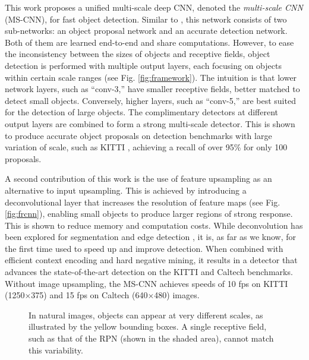 \documentclass[runningheads]{llncs}
\begin{document}
This work proposes a unified multi-scale deep CNN,
denoted the {\it multi-scale CNN\/} (MS-CNN), for fast object detection.
Similar to \cite{DBLP:conf/nips/shaoqing15fasterRcnn}, this
network consists of two sub-networks: an object proposal network and an
accurate detection network. Both of them are learned end-to-end and share
computations. However, to ease the inconsistency between the sizes of
objects and receptive fields, object detection is performed with multiple
output layers, each focusing on objects within certain scale ranges
(see Fig. \ref{fig:framework}). The intuition is that lower network layers,
such as ``conv-3,'' have smaller receptive fields, better matched
to detect small objects. Conversely, higher layers, such as ``conv-5,''
are best suited for the detection of large objects. The complimentary
detectors at different output layers are combined to form a strong
multi-scale detector. This is shown to produce accurate object
proposals on detection benchmarks with large variation
of scale, such as KITTI \cite{DBLP:conf/cvpr/GeigerLU12},
achieving a recall of over 95\% for only 100 proposals.

A second contribution of this work is the use of feature upsampling as an
alternative to input upsampling. This is achieved by introducing a
deconvolutional layer that increases the resolution of feature maps
(see Fig. \ref{fig:frcnn}), enabling small objects to produce larger
regions of strong response. This is shown to  reduce memory and computation
costs. While deconvolution has been explored for segmentation
\cite{DBLP:conf/cvpr/LongSD15} and edge
detection \cite{DBLP:conf/iccv/XieT15}, it is, as far as we know, for
the first time used to speed up and improve detection. When combined
with efficient context encoding and hard negative mining, it results
in a detector that advances the state-of-the-art detection on
the KITTI \cite{DBLP:conf/cvpr/GeigerLU12} and
Caltech \cite{DBLP:journals/pami/DollarWSP12} benchmarks.
Without image upsampling, the MS-CNN achieves speeds of 10 fps on KITTI
(1250$\times$375) and 15 fps on Caltech (640$\times$480) images.



\begin{figure}[!t]
\centering
\centerline{}
\caption{In natural images, objects can appear at very different
scales, as illustrated by the yellow bounding boxes.
A single receptive field, such as that of the RPN
\cite{DBLP:conf/nips/shaoqing15fasterRcnn} (shown in the shaded area),
cannot match this variability.}
\label{fig:receptive field}
\end{figure}
\end{document}
